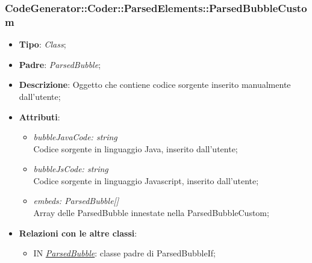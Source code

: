 \documentclass[../DefinizioneDiProdotto.tex]{subfiles}
\begin{document}
			\subsubsection{CodeGenerator::Coder::ParsedElements::ParsedBubbleCustom}
			\hypertarget{SWEDesigner::Server::CodeGenerator::Coder::ParsedElements::ParsedBubbleCustom}{}
			\begin{itemize}
				\item \textbf{Tipo}: \emph{Class};
				\item \textbf{Padre}: \emph{ParsedBubble};
				\item \textbf{Descrizione}: Oggetto che contiene codice sorgente inserito manualmente dall'utente;
				\item \textbf{Attributi}:
				\begin{itemize}
					\item \emph{bubbleJavaCode: string} \\
					Codice sorgente in linguaggio Java, inserito dall'utente;
						\item \emph{bubbleJsCode: string} \\
					Codice sorgente in linguaggio Javascript, inserito dall'utente;
					\item \emph{embeds: ParsedBubble[]} \\
					Array delle ParsedBubble innestate nella ParsedBubbleCustom;
				\end{itemize}
				\item \textbf{Relazioni con le altre classi}:	
				\begin{itemize}
					\item IN \hyperlink{SWEDesigner::Server::CodeGenerator::Coder::ParsedElements::ParsedBubble}{\emph{ParsedBubble}}: classe padre di ParsedBubbleIf; 
				\end{itemize}
			\end{itemize}
		
\end{document}
